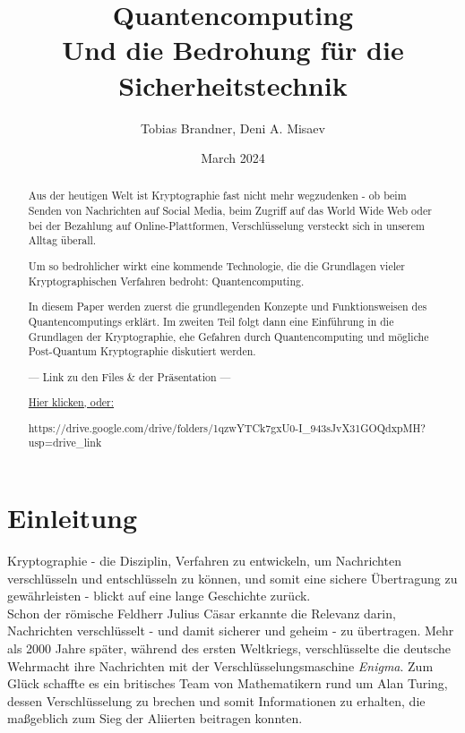\documentclass[12pt]{article}
\title{\Huge Quantencomputing \\
\LARGE Und die Bedrohung für die Sicherheitstechnik}
\author{Tobias Brandner, Deni A. Misaev}
\date{March 2024}
\begin{document}
\maketitle

\begin{abstract}
\centering
Aus der heutigen Welt ist Kryptographie fast nicht mehr wegzudenken - ob beim Senden von Nachrichten auf Social Media, beim Zugriff auf das World Wide Web oder bei der Bezahlung auf Online-Plattformen, Verschlüsselung versteckt sich in unserem Alltag überall.

Um so bedrohlicher wirkt eine kommende Technologie, die die Grundlagen vieler Kryptographischen Verfahren bedroht: Quantencomputing.

In diesem Paper werden zuerst die grundlegenden Konzepte und Funktionsweisen des Quantencomputings erklärt. Im zweiten Teil folgt dann eine Einführung in die Grundlagen der Kryptographie, ehe Gefahren durch Quantencomputing und mögliche Post-Quantum Kryptographie diskutiert werden.

--- Link zu den Files \& der Präsentation ---

\href{https://drive.google.com/drive/folders/1qzwYTCk7gxU0-I\_943sJvX31GOQdxpMH?usp=drive\_link}{Hier klicken, oder:}

https://drive.google.com/drive/folders/1qzwYTCk7gxU0-I\_943sJvX31GOQdxpMH?usp=drive\_link

\end{abstract}

\tableofcontents

\clearpage
\section{Einleitung}

Kryptographie - die Disziplin, Verfahren zu entwickeln, um Nachrichten verschlüsseln und entschlüsseln zu können, und somit eine sichere Übertragung zu gewährleisten - blickt auf eine lange Geschichte zurück. \\

Schon der römische Feldherr Julius Cäsar erkannte die Relevanz darin, Nachrichten verschlüsselt - und damit sicherer und geheim - zu übertragen. \cite{Uhl2022Krypto} Mehr als 2000 Jahre später, während des ersten Weltkriegs, verschlüsselte die deutsche Wehrmacht ihre Nachrichten mit der Verschlüsselungsmaschine \textit{Enigma}. Zum Glück schaffte es ein britisches Team von Mathematikern rund um Alan Turing, dessen Verschlüsselung zu brechen und somit Informationen zu erhalten, die maßgeblich zum Sieg der Aliierten beitragen konnten. \cite{Enigma} \\
\end{document}
